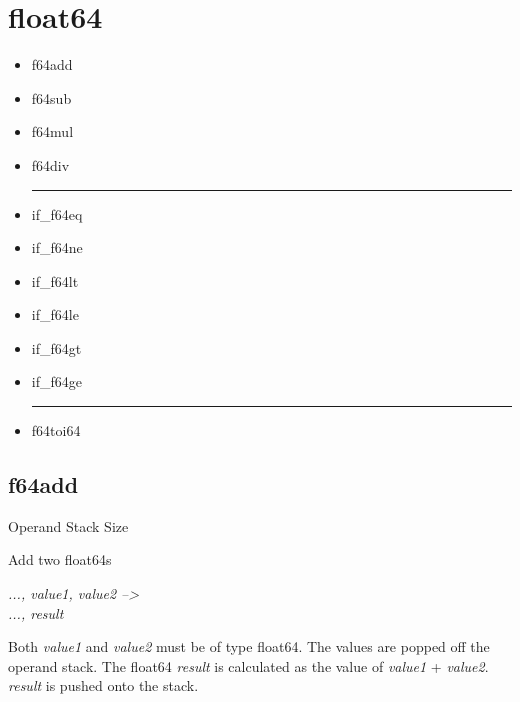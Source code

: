 \documentclass[12pt]{article}
\begin{document}
	\section{float64}
		\begin{itemize}
			\item f64add
			\item f64sub
			\item f64mul
			\item f64div
			\\ \hrule
			\item if\_f64eq
			\item if\_f64ne
			\item if\_f64lt
			\item if\_f64le
			\item if\_f64gt
			\item if\_f64ge
			\\ \hrule
			\item f64toi64
		\end{itemize}
		\newpage
		\subsection*{f64add}
			\begin{labeling}{Operand Stack Size}
				\item [\textbf{Operation}] Add two float64s
				\item [\textbf{Format}] 
				\item [\textbf{Operand Stack}] \textit{..., value1, value2 --\textgreater} \\
										\textit{..., result}
				\item [\textbf{Description}] Both \textit{value1} and \textit{value2} must be of type float64. The values are popped off the operand stack. The float64 \textit{result} is calculated as the value of \textit{value1} + \textit{value2}. \textit{result} is pushed onto the stack. \\ \\
			\end{labeling}	
		\newpage
		
\end{document}
